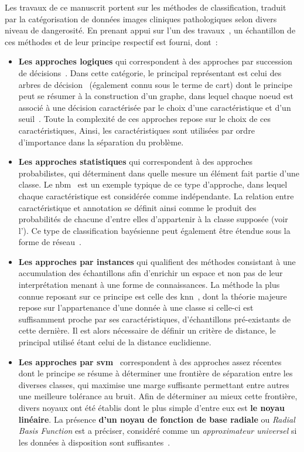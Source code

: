 Les travaux de ce manuscrit portent sur les méthodes de classification, traduit par la catégorisation de données images cliniques pathologiques selon divers niveau de dangerosité. En prenant appui sur l'un des travaux~\cite{Kotsiantis2007}, un échantillon de ces méthodes et de leur principe respectif est fourni, dont~:
\begin{itemize}
    \item \textbf{Les approches logiques} qui correspondent à des approches par succession de décisions~\cite{Kotsiantis2007}. Dans cette catégorie, le principal représentant est celui des arbres de décision~\cite{Breiman1984} (également connu sous le terme de \gls{cart}) dont le principe peut se résumer à la construction d'un graphe, dans lequel chaque noeud est associé à une décision caractérisée par le choix d'une caractéristique et d'un seuil~\cite{Quinlan1986}. Toute la complexité de ces approches repose sur le choix de ces caractéristiques, Ainsi, les caractéristiques sont utilisées par ordre d'importance dans la séparation du problème.
    \item \textbf{Les approches statistiques} qui correspondent à des approches probabilistes, qui déterminent dans quelle mesure un élément fait partie d'une classe. Le \gls{nbm}~\cite{Zhang2004} est un exemple typique de ce type d'approche, dans lequel chaque caractéristique est considérée comme indépendante. La relation entre caractéristique et annotation se définit ainsi comme le produit des probabilités de chacune d'entre elles d'appartenir à la classe supposée (voir l'). Ce type de classification bayésienne peut également être étendue sous la forme de réseau~\cite{Kononenko1989}.
    \item \textbf{Les approches par instances} qui qualifient des méthodes consistant à une accumulation des échantillons afin d'enrichir un espace et non pas de leur interprétation menant à une forme de connaissances. La méthode la plus connue reposant sur ce principe est celle des \gls{knn}~\cite{Cover1967}, dont la théorie majeure repose sur l'appartenance d'une donnée à une classe si celle-ci est suffisamment proche par ses caractéristiques, d'échantillons pré-existants de cette dernière. Il est alors nécessaire de définir un critère de distance, le principal utilisé étant celui de la distance euclidienne. 
    \item \textbf{Les approches par \gls{svm}}~\cite{Cortes1995} correspondent à des approches assez récentes dont le principe se résume à déterminer une frontière de séparation entre les diverses classes, qui maximise une marge suffisante permettant entre autres une meilleure tolérance au bruit. Afin de déterminer au mieux cette frontière, divers noyaux ont été établis dont le plus simple d'entre eux est \textbf{le noyau linéaire}. La présence \textbf{d'un noyau de fonction de base radiale} ou \textit{Radial Basis Function} est a préciser, considéré comme un \textit{approximateur universel} si les données à disposition sont suffisantes~\cite{Wang2004}.

\end{itemize}
